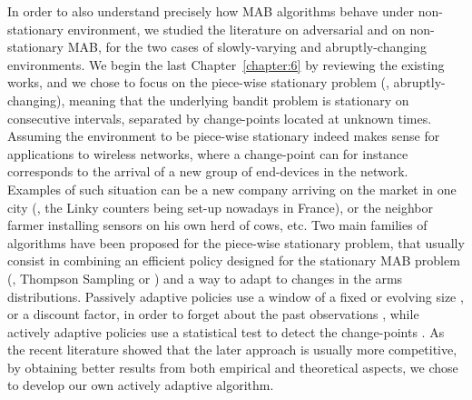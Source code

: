 %
In order to also understand precisely how MAB algorithms behave under non-stationary environment, we studied the literature on adversarial and on non-stationary MAB, for the two cases of slowly-varying and abruptly-changing environments.
We begin the last Chapter~\ref{chapter:6} by reviewing the existing works,
and we chose to focus on the piece-wise stationary problem (\ie, abruptly-changing),
meaning that the underlying bandit problem is stationary on consecutive intervals, separated by change-points located at unknown times.
Assuming the environment to be piece-wise stationary indeed makes sense for applications to wireless networks, where a change-point can for instance corresponds to the arrival of a new group of end-devices in the network. Examples of such situation can be a new company arriving on the market in one city (\eg, the Linky counters being set-up nowadays in France), or the neighbor farmer installing sensors on his own herd of cows, etc.
%
Two main families of algorithms have been proposed for the piece-wise stationary problem,
that usually consist in combining an efficient policy designed for the stationary MAB problem (\eg, Thompson Sampling or \klUCB) and a way to adapt to changes in the arms distributions.
Passively adaptive policies use a window of a fixed or evolving size \cite{Garivier11UCBDiscount}, or a discount factor, in order to forget about the past observations \cite{Kocsis06,Gupta11thompson},
while actively adaptive policies use a statistical test to detect the change-points \cite{MellorShapiro13,Allesiardo15}.
%
As the recent literature showed that the later approach is usually more competitive, by obtaining better results from both empirical and theoretical aspects, we chose to develop our own actively adaptive algorithm.

